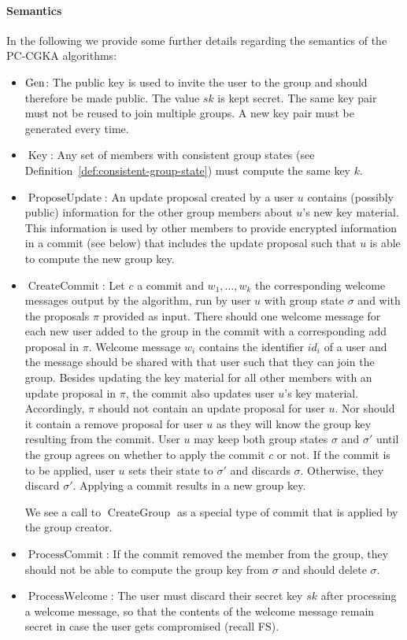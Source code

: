 \paragraph{Semantics} In the following we provide some further details regarding the semantics of the PC-CGKA algorithms:
\begin{itemize}
	\item $\mathrm{Gen}$: The public key is used to invite the user to the group and should therefore be made public. The value $sk$ is kept secret. The same key pair must not be reused to join multiple groups. A new key pair must be generated every time.
	\item $\operatorname{Key}$: Any set of members with consistent group states (see Definition~\vref{def:consistent-group-state}) must compute the same key $k$.
	\item $\operatorname{ProposeUpdate}$: An update proposal created by a user $u$ contains (possibly public) information for the other group members about $u$'s new key material. This information is used by other members to provide encrypted information in a commit (see below) that includes the update proposal such that $u$ is able to compute the new group key.
	\item $\operatorname{CreateCommit}$: Let $c$ a commit and $w_1, \ldots, w_k$ the corresponding welcome messages output by the algorithm, run by user $u$ with group state $\sigma$ and with the proposals $\pi$ provided as input. There should one welcome message for each new user added to the group in the commit with a corresponding add proposal in $\pi$. Welcome message $w_i$ contains the identifier $id_i$ of a user and the message should be shared with that user such that they can join the group. Besides updating the key material for all other members with an update proposal in $\pi$, the commit also updates user $u$'s key material. Accordingly, $\pi$ should not contain an update proposal for user $u$. Nor should it contain a remove proposal for user $u$ as they will know the group key resulting from the commit. User $u$ may keep both group states $\sigma$ and $\sigma'$ until the group agrees on whether to apply the commit $c$ or not. If the commit is to be applied, user $u$ sets their state to $\sigma'$ and discards $\sigma$. Otherwise, they discard $\sigma'$. Applying a commit results in a new group key.

	      We see a call to $\operatorname{CreateGroup}$ as a special type of commit that is applied by the group creator.
	\item $\operatorname{ProcessCommit}$: If the commit removed the member from the group, they should not be able to compute the group key from $\sigma$ and should delete $\sigma$.
	\item $\operatorname{ProcessWelcome}$:  The user must discard their secret key $sk$ after processing a welcome message, so that the contents of the welcome message remain secret in case the user gets compromised (recall FS).
\end{itemize}

